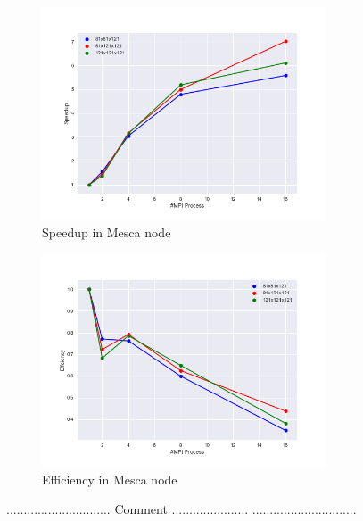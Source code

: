 \begin{figure}[]
\centering 
\includegraphics[width=0.75\textwidth]{images/SpeedupMesca.png}
\caption{Speedup in Mesca node}
\label{Mesca_Time} 
\end{figure}
\begin{figure}[]
\centering 
\includegraphics[width=0.75\textwidth]{images/EffciencyMesca.png}
\caption{Efficiency in Mesca node}
\label{Mesca_Time} 
\end{figure}



.............................. \newline
Comment ...................... \newline
.............................. \newline



